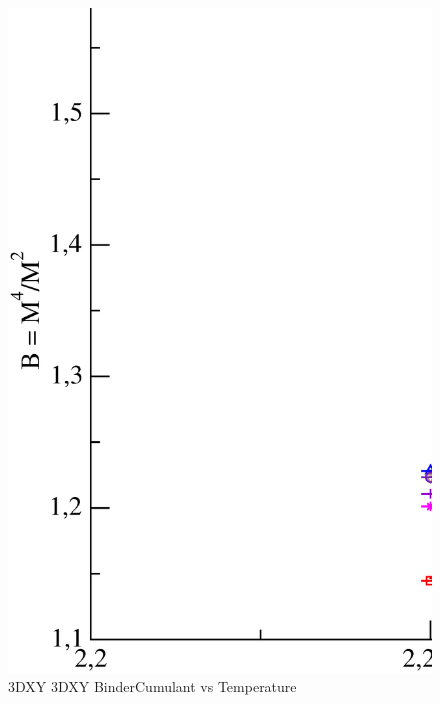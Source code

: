 \begin{figure}[!htpb]
  \centering
  \includegraphics[width=\textwidth]{./plots/3DXY/3DXY_BinderCumulant_vs_Temperature.eps}
  \caption{3DXY 3DXY BinderCumulant vs Temperature}
\end{figure}

